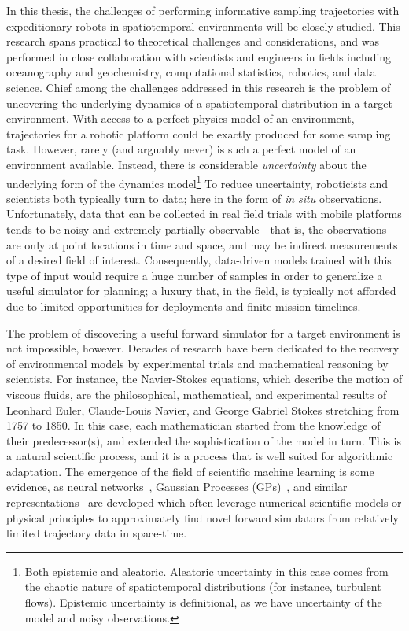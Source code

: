 In this thesis, the challenges of performing informative sampling trajectories with expeditionary robots in spatiotemporal environments will be closely studied. 
This research spans practical to theoretical challenges and considerations, and was performed in close collaboration with scientists and engineers in fields including oceanography and geochemistry, computational statistics, robotics, and data science.
Chief among the challenges addressed in this research is the problem of uncovering the underlying dynamics of a spatiotemporal distribution in a target environment.
With access to a perfect physics model of an environment, trajectories for a robotic platform could be exactly produced for some sampling task.
However, rarely (and arguably never) is such a perfect model of an environment available.
Instead, there is considerable \emph{uncertainty} about the underlying form of the dynamics model\footnote{Both epistemic and aleatoric. Aleatoric uncertainty in this case comes from the chaotic nature of spatiotemporal distributions (for instance, turbulent flows). Epistemic uncertainty is definitional, as we have uncertainty of the model and noisy observations.}
To reduce uncertainty, roboticists and scientists both typically turn to data; here in the form of \emph{in situ} observations.
Unfortunately, data that can be collected in real field trials with mobile platforms tends to be noisy and extremely partially observable---that is, the observations are only at point locations in time and space, and may be indirect measurements of a desired field of interest. 
Consequently, data-driven models trained with this type of input would require a huge number of samples in order to generalize a useful simulator for planning; a luxury that, in the field, is typically not afforded due to limited opportunities for deployments and finite mission timelines.

The problem of discovering a useful forward simulator for a target environment is not impossible, however.
Decades of research have been dedicated to the recovery of environmental models by experimental trials and mathematical reasoning by scientists.
For instance, the Navier-Stokes equations, which describe the motion of viscous fluids, are the philosophical, mathematical, and experimental results of Leonhard Euler, Claude-Louis Navier, and George Gabriel Stokes stretching from 1757 to 1850. 
In this case, each mathematician started from the knowledge of their predecessor(s), and extended the sophistication of the model in turn.
This is a natural scientific process, and it is a process that is well suited for algorithmic adaptation.
The emergence of the field of scientific machine learning is some evidence, as neural networks~\autocite{raissi2019physics, sapsis2009dynamically, mohan2019compressed}, Gaussian Processes (GPs)~\autocite{raissi2018numerical}, and similar representations~\autocite{kulkarni2019advection, brunton2016discovering} are developed which often leverage numerical scientific models or physical principles to approximately find novel forward simulators from relatively limited trajectory data in space-time.

